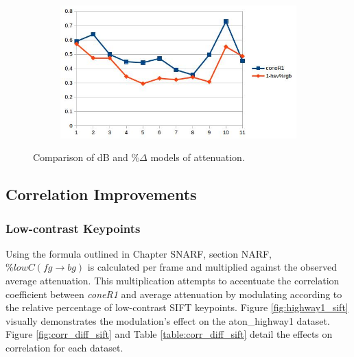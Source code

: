 \documentclass[12pt]{report}
\begin{document}
\begin{figure}
\begin{subfigure}{.49\linewidth}
  \caption{}
\end{subfigure}
\begin{subfigure}{.49\linewidth}
  \includegraphics[width=1\linewidth]{figures/correlations/rgb/pets2_hsv.jpg}
  \caption{}
\end{subfigure}

\caption{Comparison of dB and \%$\Delta$ models of attenuation. }
\label{fig:corr_compare}
\end{figure}

\subsection{Correlation Improvements}
\subsubsection{Low-contrast Keypoints}

Using the formula outlined in Chapter SNARF, section NARF, $\%lowC(fg \rightarrow bg)$ is calculated per frame and multiplied against the observed average attenuation. This multiplication attempts to accentuate the correlation coefficient between \textit{coneR1} and average attenuation by modulating according to the relative percentage of low-contrast SIFT keypoints. Figure \ref{fig:highway1_sift} visually demonstrates the modulation's effect on the aton\_highway1 dataset. Figure \ref{fig:corr_diff_sift} and Table \ref{table:corr_diff_sift} detail the effects on correlation for each dataset.
\end{document}
